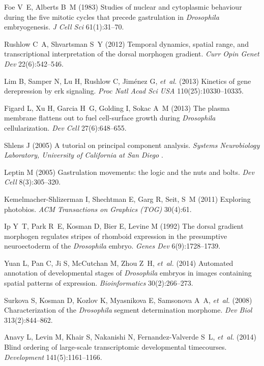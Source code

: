 \documentclass{pnastwo}
\begin{document}
\begin{article}
\begin{thebibliography}{10}
Foe V~E, Alberts B~M (1983) Studies of nuclear and cytoplasmic behaviour during
  the five mitotic cycles that precede gastrulation in \textit{{D}rosophila}
  embryogenesis. \textit{J Cell Sci} 61(1):31--70.

Rushlow C~A, Shvartsman S~Y (2012) Temporal dynamics, spatial range, and
  transcriptional interpretation of the dorsal morphogen gradient.
  \textit{Curr Opin Genet Dev} 22(6):542--546.

Lim B, Samper N, Lu H, Rushlow C, Jim{\'e}nez G, \textit{et~al.} (2013)
  Kinetics of gene derepression by erk signaling. \textit{Proc Natl Acad Sci USA} 110(25):10330--10335.

Figard L, Xu H, Garcia H~G, Golding I, Sokac A~M (2013) The plasma membrane
  flattens out to fuel cell-surface growth during \textit{{D}rosophila}
  cellularization. \textit{Dev Cell} 27(6):648--655.

Shlens J (2005) A tutorial on principal component analysis. \textit{Systems
  Neurobiology Laboratory, University of California at San Diego} .

Leptin M (2005) Gastrulation movements: the logic and the nuts and bolts.
  \textit{Dev Cell} 8(3):305--320.

Kemelmacher-Shlizerman I, Shechtman E, Garg R, Seit, S~M (2011)
Exploring photobios. \textit{ACM Transactions on Graphics (TOG)} 30(4):61.

Ip Y~T, Park R~E, Kosman D, Bier E, Levine M (1992) 
The dorsal gradient morphogen regulates stripes of rhomboid expression in the presumptive neuroectoderm of the \textit{Drosophila} embryo. \textit{Genes Dev} 6(9):1728--1739.

Yuan L, Pan C, Ji S, McCutchan M, Zhou Z~H, \textit{et~al.} (2014) Automated
  annotation of developmental stages of \textit{{D}rosophila} embryos in images
  containing spatial patterns of expression. \textit{Bioinformatics}
  30(2):266--273.

Surkova S, Kosman D, Kozlov K, Myasnikova E, Samsonova A~A, \textit{et~al.}
  (2008) Characterization of the \textit{{D}rosophila} segment determination
  morphome. \textit{Dev Biol} 313(2):844--862.

Anavy L, Levin M, Khair S, Nakanishi N, Fernandez-Valverde S~L, \textit{et~al.}
  (2014) Blind ordering of large-scale transcriptomic developmental
  timecourses. \textit{Development} 141(5):1161--1166.


\end{thebibliography}
\end{article}
\end{document}
